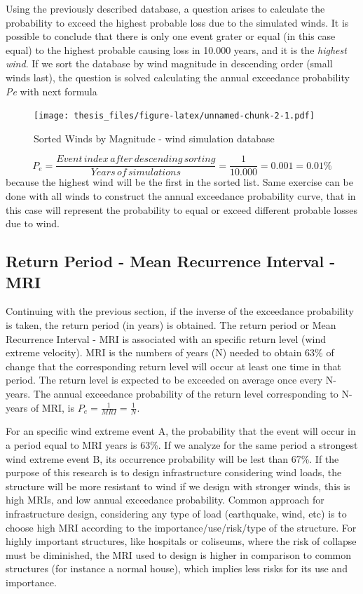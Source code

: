 \documentclass[12pt,oneside]{reedthesis}
\begin{document}
Using the previously described database, a question arises to calculate the probability to exceed the highest probable loss due to the simulated winds. It is possible to conclude that there is only one event grater or equal (in this case equal) to the highest probable causing loss in 10.000 years, and it is the \emph{highest wind}. If we sort the database by wind magnitude in descending order (small winds last), the question is solved calculating the annual exceedance probability \emph{Pe} with next formula

\footnotesize
\begin{figure}
\centering
\texttt{[image: thesis\_files/figure-latex/unnamed-chunk-2-1.pdf]}
\caption{\label{fig:unnamed-chunk-2}Sorted Winds by Magnitude - wind simulation database}
\end{figure}
\normalsize

\[
P_e = \frac{Event\,index\,after\,descending\,sorting}{Years\,of\,simulations } = \frac{1}{10.000}=0.001=0.01\%
\]
because the highest wind will be the first in the sorted list. Same exercise can be done with all winds to construct the annual exceedance probability curve, that in this case will represent the probability to equal or exceed different probable losses due to wind.

\hypertarget{return-period---mean-recurrence-interval---mri}{%
\subsection{Return Period - Mean Recurrence Interval - MRI}\label{return-period---mean-recurrence-interval---mri}}

Continuing with the previous section, if the inverse of the exceedance probability is taken, the return period (in years) is obtained. The return period or Mean Recurrence Interval - MRI is associated with an specific return level (wind extreme velocity). MRI is the numbers of years (N) needed to obtain 63\% of change that the corresponding return level will occur at least one time in that period. The return level is expected to be exceeded on average once every N-years. The annual exceedance probability of the return level corresponding to N-years of MRI, is \(P_e=\frac{1}{MRI}=\frac{1}{N}\).

For an specific wind extreme event A, the probability that the event will occur in a period equal to MRI years is 63\%. If we analyze for the same period a strongest wind extreme event B, its occurrence probability will be lest than 67\%. If the purpose of this research is to design infrastructure considering wind loads, the structure will be more resistant to wind if we design with stronger winds, this is high MRIs, and low annual exceedance probability. Common approach for infrastructure design, considering any type of load (earthquake, wind, etc) is to choose high MRI according to the importance/use/risk/type of the structure. For highly important structures, like hospitals or coliseums, where the risk of collapse must be diminished, the MRI used to design is higher in comparison to common structures (for instance a normal house), which implies less risks for its use and importance.
\end{document}
